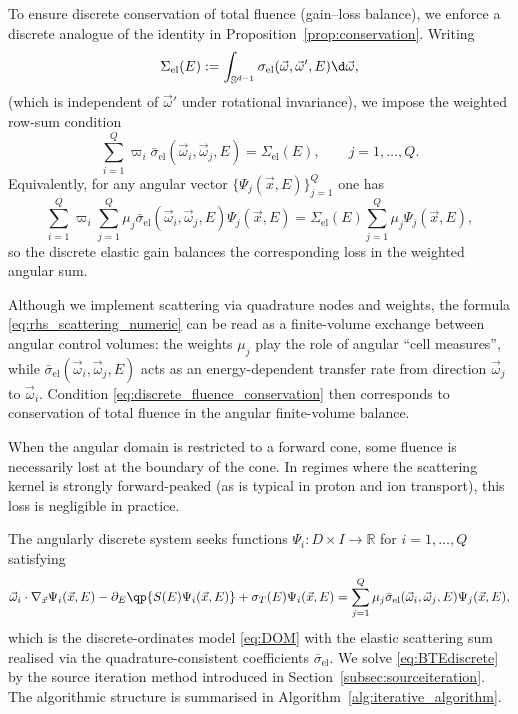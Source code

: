 \documentclass[final]{amsart}
\begin{document}
To ensure discrete conservation of total fluence (gain--loss balance), we
enforce a discrete analogue of the identity in
Proposition~\ref{prop:conservation}. Writing
\[
  \Sigma_{\mathrm{el}}(E)
  :=
  \int_{\mathbb S^{d-1}}
  \sigma_{\mathrm{el}}(\vec{\omega},\vec{\omega}',E) \d\vec{\omega},
\]
(which is independent of $\vec{\omega}'$ under rotational invariance),
we impose the weighted row-sum condition
\begin{equation}
  \label{eq:discrete_fluence_conservation}
  \sum_{i=1}^Q \varpi_i \bar\sigma_{\mathrm{el}}(\vec{\omega}_i,\vec{\omega}_j,E)
  =
  \Sigma_{\mathrm{el}}(E),
  \qquad j=1,\dots,Q.
\end{equation}
Equivalently, for any angular vector $\{\Psi_j(\vec{x},E)\}_{j=1}^Q$ one has
\[
  \sum_{i=1}^Q \varpi_i
  \sum_{j=1}^Q \mu_j \bar\sigma_{\mathrm{el}}(\vec{\omega}_i,\vec{\omega}_j,E) 
  \Psi_j(\vec{x},E)
  =
  \Sigma_{\mathrm{el}}(E)\sum_{j=1}^Q \mu_j \Psi_j(\vec{x},E),
\]
so the discrete elastic gain balances the corresponding loss in the
weighted angular sum.

\begin{remark}
Although we implement scattering via quadrature nodes and weights, the
formula \eqref{eq:rhs_scattering_numeric} can be read as a finite-volume
exchange between angular control volumes: the weights $\mu_j$ play the
role of angular ``cell measures'', while
$\bar\sigma_{\mathrm{el}}(\vec{\omega}_i,\vec{\omega}_j,E)$ acts as an
energy-dependent transfer rate from direction $\vec{\omega}_j$ to
$\vec{\omega}_i$. Condition \eqref{eq:discrete_fluence_conservation}
then corresponds to conservation of total fluence in the angular
finite-volume balance.

When the angular domain is restricted to a forward cone, some fluence
is necessarily lost at the boundary of the cone. In regimes where the
scattering kernel is strongly forward-peaked (as is typical in proton
and ion transport), this loss is negligible in practice.
\end{remark}

The angularly discrete system seeks functions $\Psi_i:D\times I\to\mathbb{R}$
for $i=1,\dots,Q$ satisfying
\begin{equation}
  \label{eq:BTEdiscrete}
  \vec{\omega}_i \cdot \nabla_{\vec{x}} \Psi_i(\vec{x},E)
  -
  \partial_E\qp{S(E)\Psi_i(\vec{x},E)}
  +
  \sigma_T(E)\Psi_i(\vec{x},E)
  =
  \sum_{j=1}^Q \mu_j \bar\sigma_{\mathrm{el}}(\vec{\omega}_i,\vec{\omega}_j,E) \Psi_j(\vec{x},E),
\end{equation}
which is the discrete-ordinates model \eqref{eq:DOM} with the elastic
scattering sum realised via the quadrature-consistent coefficients
$\bar\sigma_{\mathrm{el}}$. We solve \eqref{eq:BTEdiscrete} by the source
iteration method introduced in Section~\ref{subsec:sourceiteration}. The
algorithmic structure is summarised in Algorithm~\ref{alg:iterative_algorithm}.
\end{document}
